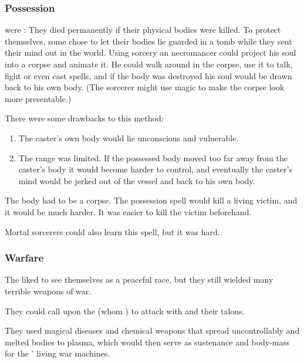\subsubsection{Possession}
\Ophidians were : 
They died permanently if their physical bodies were killed. 
To protect themselves, some \ophidians chose to let their bodies lie guarded in a tomb while they sent their mind out in the world.
Using sorcery an \ophidian necromancer could project his soul into a corpse and animate it. 
He could walk around in the corpse, use it to talk, fight or even cast spells, and if the body was destroyed his soul would be drawn back to his own body.
(The sorcerer might use magic to make the corpse look more presentable.)

There were some drawbacks to this method:
\begin{enumerate}
  \item 
    The caster's own body would lie unconscious and vulnerable.
  \item 
    The range was limited.
    If the possessed body moved too far away from the caster's body it would become harder to control, and eventually the caster's mind would be jerked out of the vessel and back to his own body.
\end{enumerate}


The body had to be a corpse. 
The possession spell would kill a living victim, and it would be much harder. 
It was easier to kill the victim beforehand. 

Mortal sorcerers could also learn this spell, but it was hard.





\subsubsection{Warfare}
The \ophidians liked to see themselves as a peaceful race, but they still wielded many terrible weapons of war.

They could call upon the  (whom ) to attack with  and their talons.

They used magical diseases and chemical weapons that spread uncontrollably and melted bodies to plasma, which would then serve as sustenance and body-mass for the \ophidians' living war machines. 

